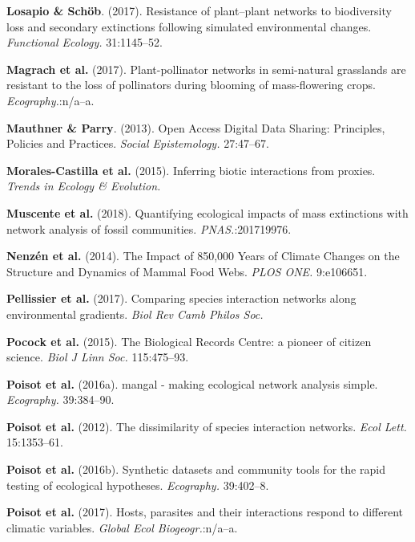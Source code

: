 \leavevmode\hypertarget{ref-LosaScho17}{}%
\textbf{Losapio \& Schöb}. (2017). Resistance of plant--plant networks
to biodiversity loss and secondary extinctions following simulated
environmental changes. \emph{Functional Ecology.} 31:1145--52.

\leavevmode\hypertarget{ref-MagrHolz17}{}%
\textbf{Magrach et al.} (2017). Plant-pollinator networks in
semi-natural grasslands are resistant to the loss of pollinators during
blooming of mass-flowering crops. \emph{Ecography.}:n/a--a.

\leavevmode\hypertarget{ref-MautParr13}{}%
\textbf{Mauthner \& Parry}. (2013). Open Access Digital Data Sharing:
Principles, Policies and Practices. \emph{Social Epistemology.}
27:47--67.

\leavevmode\hypertarget{ref-MoraMati15}{}%
\textbf{Morales-Castilla et al.} (2015). Inferring biotic interactions
from proxies. \emph{Trends in Ecology \& Evolution.}

\leavevmode\hypertarget{ref-MuscPrab18}{}%
\textbf{Muscente et al.} (2018). Quantifying ecological impacts of mass
extinctions with network analysis of fossil communities.
\emph{PNAS.}:201719976.

\leavevmode\hypertarget{ref-NenzMont14}{}%
\textbf{Nenzén et al.} (2014). The Impact of 850,000 Years of Climate
Changes on the Structure and Dynamics of Mammal Food Webs. \emph{PLOS
ONE.} 9:e106651.

\leavevmode\hypertarget{ref-PellAlbo17}{}%
\textbf{Pellissier et al.} (2017). Comparing species interaction
networks along environmental gradients. \emph{Biol Rev Camb Philos Soc.}

\leavevmode\hypertarget{ref-PocoRoy15}{}%
\textbf{Pocock et al.} (2015). The Biological Records Centre: a pioneer
of citizen science. \emph{Biol J Linn Soc.} 115:475--93.

\leavevmode\hypertarget{ref-PoisBais16}{}%
\textbf{Poisot et al.} (2016a). mangal - making ecological network
analysis simple. \emph{Ecography.} 39:384--90.

\leavevmode\hypertarget{ref-PoisCana12}{}%
\textbf{Poisot et al.} (2012). The dissimilarity of species interaction
networks. \emph{Ecol Lett.} 15:1353--61.

\leavevmode\hypertarget{ref-PoisGrav16}{}%
\textbf{Poisot et al.} (2016b). Synthetic datasets and community tools
for the rapid testing of ecological hypotheses. \emph{Ecography.}
39:402--8.

\leavevmode\hypertarget{ref-PoisGuev17}{}%
\textbf{Poisot et al.} (2017). Hosts, parasites and their interactions
respond to different climatic variables. \emph{Global Ecol
Biogeogr.}:n/a--a.

